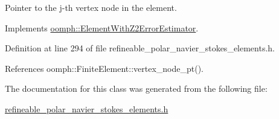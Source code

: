 Pointer to the j-\/th vertex node in the element. 



Implements \hyperlink{classoomph_1_1ElementWithZ2ErrorEstimator_a0eedccc33519f852c5dc2055ddf2774b}{oomph\+::\+Element\+With\+Z2\+Error\+Estimator}.



Definition at line 294 of file refineable\+\_\+polar\+\_\+navier\+\_\+stokes\+\_\+elements.\+h.



References oomph\+::\+Finite\+Element\+::vertex\+\_\+node\+\_\+pt().



The documentation for this class was generated from the following file\+:\begin{DoxyCompactItemize}
\item 
\hyperlink{refineable__polar__navier__stokes__elements_8h}{refineable\+\_\+polar\+\_\+navier\+\_\+stokes\+\_\+elements.\+h}\end{DoxyCompactItemize}
